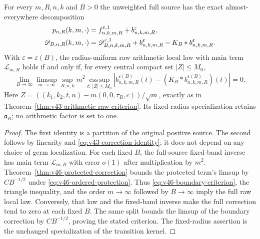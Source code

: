 \begin{theorem}
\label{thm:v46-boundary-reduction}
For every $m,R,n,k$ and $B>0$ the unweighted full source has the exact
almost-everywhere decomposition
\begin{align}
 p_{n,R}(k,m,\cdot)&=f^{\varepsilon,1}_{n,k,m,R}
                                      +b^{\varepsilon}_{n,k,m,R},\notag\\
 \mathscr D_{B,n,R}(k,m,\cdot)
   &=\mathscr D^{\varepsilon,1}_{B,n,k,m,R}
          +b^{\varepsilon}_{n,k,m,R}-K_B*b^{\varepsilon}_{n,k,m,R}.
                                      \label{eq:v46-full-source-split}
\end{align}
With $\varepsilon=\varepsilon(B)$, the radius-uniform raw arithmetic
local law with main term $\mathcal L_{m,R}$ holds if and only if,
for every central compact set $|Z|\le M_0$,
\begin{equation}\label{eq:v46-boundary-criterion}
 \lim_{B\to\infty}\limsup_{m\to\infty}
   \sup_{R,n,k}m^2\operatorname*{ess\,sup}_{t:\ |Z|\le M_0}
       |b^{\varepsilon(B)}_{n,k,m,R}(t)
                   -(K_B*b^{\varepsilon(B)}_{n,k,m,R})(t)|=0.
\end{equation}
Here $Z=((k_1,k_2,t,n)-m(0,0,\bar\tau_R,c))/\sqrt m$, exactly as
in Theorem~\ref{thm:v43-arithmetic-raw-criterion}. Its fixed-radius
specialization retains $\mathfrak a_R$; no arithmetic factor is set
to one.
\end{theorem}
\begin{proof}
The first identity is a partition of the original positive source.
The second follows by linearity and
\eqref{eq:v43-correction-identity}; it does not depend on any choice
of germ localization. For each fixed $B$, the full-source fixed-band
inverse has main term $\mathcal L_{m,R}$ with error $o(1)$ after
multiplication by $m^2$. Theorem~\ref{thm:v46-protected-correction}
bounds the protected term's limsup by $CB^{-1/2}$ under
\eqref{eq:v46-ordered-protection}. Thus
\eqref{eq:v46-boundary-criterion}, the triangle inequality, and the
order $m\to\infty$ followed by $B\to\infty$ imply the full raw local
law. Conversely, that law and the fixed-band inverse make the full
correction tend to zero at each fixed $B$. The same split bounds the
limsup of the boundary correction by $CB^{-1/2}$, proving the stated
criterion. The fixed-radius assertion is the unchanged specialization
of the transition kernel.
\end{proof}

